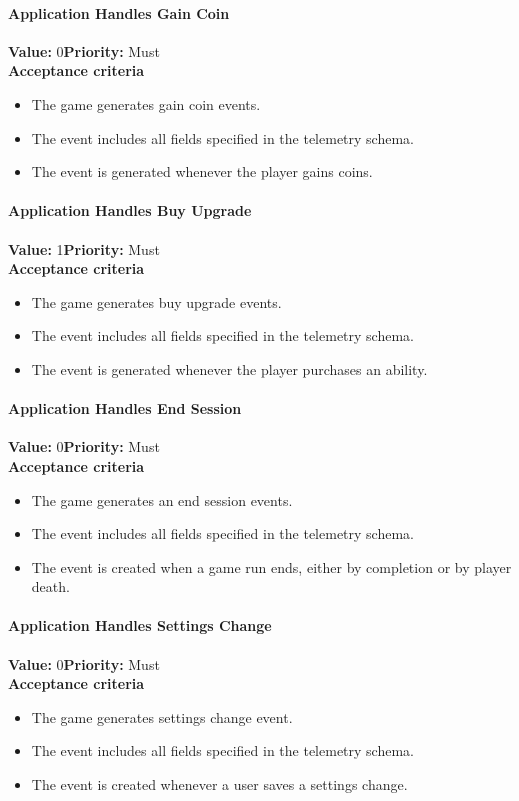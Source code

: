 \paragraph{Application Handles Gain Coin}
\textbf{Value:} 0\quad \textbf{Priority:} Must\\
\textbf{Acceptance criteria}
\begin{itemize}
  \item The game generates gain coin events.
  \item The event includes all fields specified in the telemetry schema.
  \item The event is generated whenever the player gains coins.
\end{itemize}

\paragraph{Application Handles Buy Upgrade}
\textbf{Value:} 1\quad \textbf{Priority:} Must\\
\textbf{Acceptance criteria}
\begin{itemize}
  \item The game generates buy upgrade events.
  \item The event includes all fields specified in the telemetry schema.
  \item The event is generated whenever the player purchases an ability.
\end{itemize}

\paragraph{Application Handles End Session}
\textbf{Value:} 0\quad \textbf{Priority:} Must\\
\textbf{Acceptance criteria}
\begin{itemize}
  \item The game generates an end session events.
  \item The event includes all fields specified in the telemetry schema.
  \item The event is created when a game run ends, either by completion or by player death.
\end{itemize}

\paragraph{Application Handles Settings Change}
\textbf{Value:} 0\quad \textbf{Priority:} Must\\
\textbf{Acceptance criteria}
\begin{itemize}
  \item The game generates settings change event.
  \item The event includes all fields specified in the telemetry schema.
  \item The event is created whenever a user saves a settings change.
\end{itemize}

